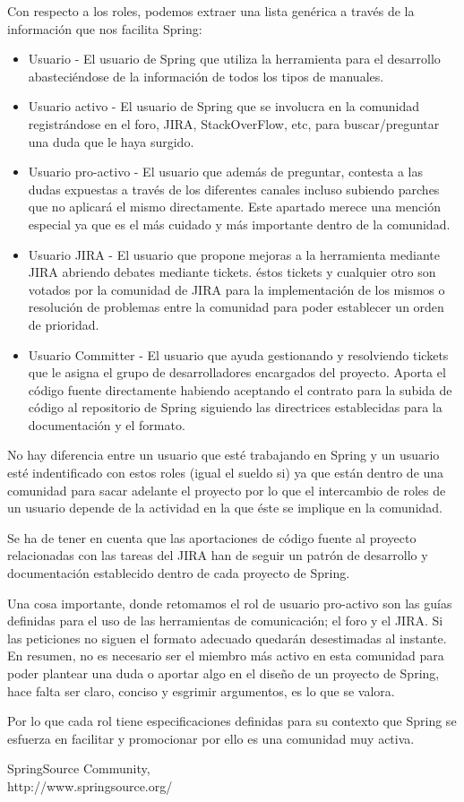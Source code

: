 \documentclass[11pt]{scrartcl}
\begin{document}
Con respecto a los roles, podemos extraer una lista gen\'erica a trav\'es de la informaci\'on que nos facilita Spring:

\begin{itemize}
    \item Usuario - El usuario de Spring que utiliza la herramienta para el desarrollo abasteci\'endose de la informaci\'on de todos los tipos de manuales.
    \item Usuario activo - El usuario de Spring que se involucra en la comunidad registr\'andose en el foro, JIRA, StackOverFlow, etc, para buscar/preguntar una duda que le haya surgido.
    \item Usuario pro-activo - El usuario que adem\'as de preguntar, contesta a las dudas expuestas a trav\'es de los diferentes canales incluso subiendo parches que no aplicar\'a el mismo directamente. Este apartado merece una menci\'on especial ya que es el m\'as cuidado y m\'as importante dentro de la comunidad.
    \item Usuario JIRA - El usuario que propone mejoras a la herramienta mediante JIRA abriendo debates mediante tickets. \'estos tickets y cualquier otro son votados por la comunidad de JIRA para la implementaci\'on de los mismos o resoluci\'on de problemas entre la comunidad para poder establecer un orden de prioridad.
    \item Usuario Committer - El usuario que ayuda gestionando y resolviendo tickets que le asigna el grupo de desarrolladores encargados del proyecto. Aporta el c\'odigo fuente directamente habiendo aceptando el contrato para la subida de c\'odigo al repositorio de Spring siguiendo las directrices establecidas para la documentaci\'on y el formato.
\end{itemize}

No hay diferencia entre un usuario que est\'e trabajando en Spring y un usuario est\'e indentificado con estos roles (igual el sueldo si) ya que est\'an dentro de una comunidad para sacar adelante el proyecto por lo que el intercambio de roles de un usuario depende de la actividad en la que \'este se implique en la comunidad.

Se ha de tener en cuenta que las aportaciones de c\'odigo fuente al proyecto relacionadas con las tareas del JIRA han de seguir un patr\'on de desarrollo y documentaci\'on establecido dentro de cada proyecto de Spring.

Una cosa importante, donde retomamos el rol de usuario pro-activo son las gu\'ias definidas para el uso de las herramientas de comunicaci\'on; el foro y el JIRA. Si las peticiones no siguen el formato adecuado quedar\'an desestimadas al instante. En resumen, no es necesario ser el miembro m\'as activo en esta comunidad para poder plantear una duda o aportar algo en el dise\~no de un proyecto de Spring, hace falta ser claro, conciso y esgrimir argumentos, es lo que se valora.

Por lo que cada rol tiene especificaciones definidas para su contexto que Spring se esfuerza en facilitar y promocionar por ello es una comunidad muy activa.

\begin{thebibliography}{9}

  SpringSource Community,\\
  http://www.springsource.org/

\end{thebibliography}
\end{document}
